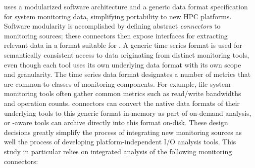 \tokio uses a modularized software architecture and a generic data format
specification for system monitoring data, simplifying portability to new HPC
platforms. Software modularity is accomplished by defining abstract
\textit{connectors} to monitoring sources; these connectors then expose interfaces for
extracting relevant data in a format suitable for \tokio.  A generic
time series format is used for semantically consistent access to data
originating from distinct monitoring tools, even though each tool uses its
own underlying data format with its own scope and granularity.
The time series data format designates a number of metrics
that are common to classes of monitoring components.  For example, file system
monitoring tools often gather common metrics such as read/write bandwidths
and operation counts. \tokio connectors can convert the native data formats
of their underlying tools to this generic format in-memory as part of
on-demand analysis, or \tokio-aware tools can archive directly into this
format on-disk. These design decisions greatly simplify the process of
integrating new monitoring sources as well the process of developing
platform-independent I/O analysis tools.  This study in particular relies on
integrated analysis of the following monitoring connectors:

